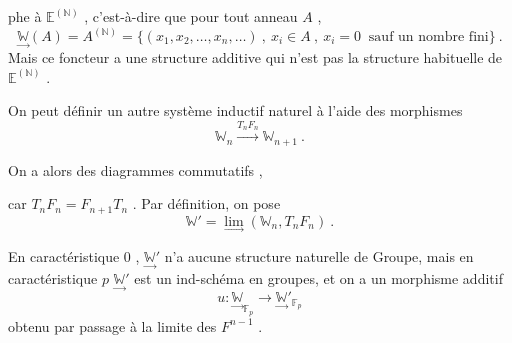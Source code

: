 phe à $\mathbb{E}^{(\mathbb{N})}$ , c'est-à-dire que pour tout anneau $A$ ,
\[
\underset{\to}{\mathbb{W}}(A) = A^{(\mathbb{N})} = \{(x_1,x_2,\ldots,x_n,\ldots) \ , \ x_i \in A \ , \ x_i = 0 \ \text{ sauf un nombre fini}\} \ .
\]
Mais ce foncteur a une structure additive qui n'est pas la structure
habituelle de $\mathbb{E}^{(\mathbb{N})}$ .

On peut définir un autre système inductif naturel à l'aide
des morphismes
\[
\mathbb{W}_n \xrightarrow{T_n F_n} \mathbb{W}_{n+1} \ .
\]

On a alors des diagrammes commutatifs
 ,

car $T_n F_n = F_{n+1} T_n$ . Par définition, on pose
\[
\mathbb{W}' = \underset{\to}{\lim}(\mathbb{W}_n, T_n F_n) \ .
\]

En caractéristique $0$ , $\underset{\to}{\mathbb{W}}'$ n'a aucune structure naturelle de Groupe,
mais en caractéristique $p$ $\underset{\to}{\mathbb{W}}'$ est un ind-schéma en groupes, et on a un
morphisme additif
\[
u : \underset{\to}{\mathbb{W}}_{\mathbb{F}_p} \to \underset{\to}{\mathbb{W}}'_{\mathbb{F}_p}
\]
obtenu par passage à la limite des $F^{n-1}$ .

